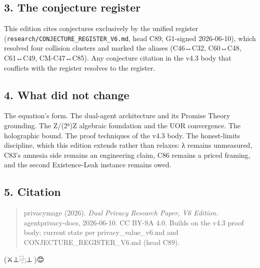 \documentclass[
  11pt,
]{article}
\begin{document}
\subsection{3. The conjecture register}\label{the-conjecture-register}

This edition cites conjectures exclusively by the unified register
(\texttt{research/CONJECTURE\_REGISTER\_V6.md}, head C89, G1-signed
2026-06-10), which resolved four collision clusters and marked the
aliases (C46↔C32, C60↔C48, C61↔C49, CM-C47↔C85). Any conjecture citation
in the v4.3 body that conflicts with the register resolves to the
register.

\subsection{4. What did not change}\label{what-did-not-change}

The equation's form. The dual-agent architecture and its Promise Theory
grounding. The Z/(2⁶)Z algebraic foundation and the UOR convergence. The
holographic bound. The proof techniques of the v4.3 body. The
honest-limits discipline, which this edition extends rather than
relaxes: λ remains unmeasured, C83's amnesia side remains an engineering
claim, C86 remains a priced framing, and the second Existence-Leak
instance remains owed.

\subsection{5. Citation}\label{citation}

\begin{quote}
privacymage (2026). \emph{Dual Privacy Research Paper, V6 Edition.}
agentprivacy-docs, 2026-06-10. CC BY-SA 4.0. Builds on the v4.3 proof
body; current state per privacy\_value\_v6.md and
CONJECTURE\_REGISTER\_V6.md (head C89).
\end{quote}

(⚔️⊥⿻⊥🧙)😊
\end{document}
